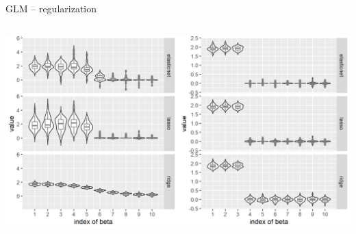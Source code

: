 \begin{frame2}{GLM -- regularization}
\begin{columns}[T, totalwidth=\textwidth]
\begin{column}{0.38\textwidth}
          \includegraphics[width=\textwidth]{figure/enet_tradeoff.png}
\end{column}

\end{columns}
  
\end{frame2}


